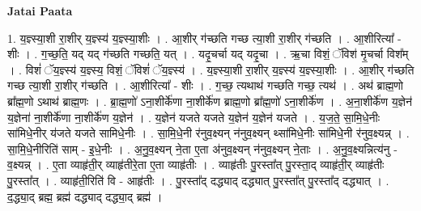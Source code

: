 \documentclass[17pt]{extarticle}
\begin{document}
\textbf{Jatai Paata} \newline

1. य॒ज्ञ्स्या॒शी रा॒शीर् य॒ज्ञ्स्य॑ य॒ज्ञ्स्या॒शीः । . आ॒शीर् ग॑च्छति गच्छ त्या॒शी रा॒शीर् ग॑च्छति । . आ॒शीरित्या᳚ - शीः । . ग॒च्छ॒ति॒ यद् यद् ग॑च्छति गच्छति॒ यत् । . यदृ॒चर्चा यद् यदृ॒चा । . ऋ॒चा विशं॒ ॅविश॑ मृ॒चर्चा विश᳚म् । . विशं॑ ॅय॒ज्ञ्स्य॑ य॒ज्ञ्स्य॒ विशं॒ ॅविशं॑ ॅय॒ज्ञ्स्य॑ । . य॒ज्ञ्स्या॒शी रा॒शीर् य॒ज्ञ्स्य॑ य॒ज्ञ्स्या॒शीः । . आ॒शीर् ग॑च्छति गच्छ त्या॒शी रा॒शीर् ग॑च्छति । . आ॒शीरित्या᳚ - शीः । . ग॒च्छ॒ त्यथाथ॑ गच्छति गच्छ॒ त्यथ॑ । . अथ॑ ब्राह्म॒णो ब्रा᳚ह्म॒णो ऽथाथ॑ ब्राह्म॒णः । . ब्रा॒ह्म॒णो॑ ऽना॒शीर्के॑णा ना॒शीर्के॑ण ब्राह्म॒णो ब्रा᳚ह्म॒णो॑ ऽना॒शीर्के॑ण । . अ॒ना॒शीर्के॑ण य॒ज्ञेन॑ य॒ज्ञेना॑ ना॒शीर्के॑णा ना॒शीर्के॑ण य॒ज्ञेन॑ । . य॒ज्ञेन॑ यजते यजते य॒ज्ञेन॑ य॒ज्ञेन॑ यजते । . य॒ज॒ते॒ सा॒मि॒धे॒नीः सा॑मिधे॒नीर् य॑जते यजते सामिधे॒नीः । . सा॒मि॒धे॒नी र॑नुव॒क्ष्यन् न॑नुव॒क्ष्यन् थ्सा॑मिधे॒नीः सा॑मिधे॒नी र॑नुव॒क्ष्यन्न् । . सा॒मि॒धे॒नीरिति॑ साम् - इ॒धे॒नीः । . अ॒नु॒व॒क्ष्यन् ने॒ता ए॒ता अ॑नुव॒क्ष्यन् न॑नुव॒क्ष्यन् ने॒ताः । . अ॒नु॒व॒क्ष्यन्नित्य॑नु - व॒क्ष्यन्न् । . ए॒ता व्याहृ॑ती॒र् व्याहृ॑तीरे॒ता ए॒ता व्याहृ॑तीः । . व्याहृ॑तीः पु॒रस्ता᳚त् पु॒रस्ता॒द् व्याहृ॑ती॒र् व्याहृ॑तीः पु॒रस्ता᳚त् । . व्याहृ॑ती॒रिति॑ वि - आहृ॑तीः । . पु॒रस्ता᳚द् दद्ध्याद् दद्ध्यात् पु॒रस्ता᳚त् पु॒रस्ता᳚द् दद्ध्यात् । . द॒द्ध्या॒द् ब्रह्म॒ ब्रह्म॑ दद्ध्याद् दद्ध्या॒द् ब्रह्म॑ । \newline
\end{document}
